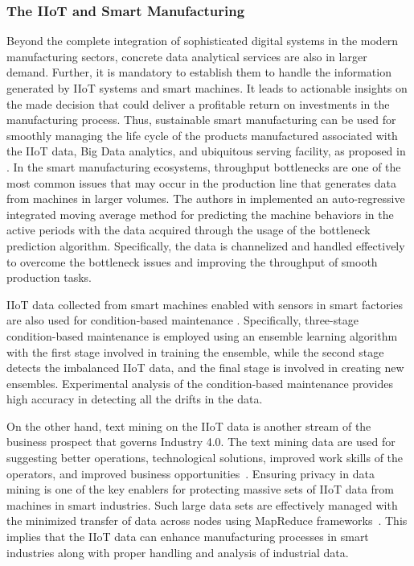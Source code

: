 \documentclass[journal]{IEEEtran}
\begin{document}
\subsubsection{The IIoT and Smart Manufacturing}
Beyond the complete integration of sophisticated digital systems in the modern manufacturing sectors, concrete data analytical services are also in larger demand. Further, it is mandatory to establish them to handle the information generated by IIoT systems and smart machines. It leads to actionable insights on the made decision that could deliver a profitable return on investments in the manufacturing process. Thus, sustainable smart manufacturing can be used for smoothly managing the life cycle of the products manufactured associated with the IIoT data, Big Data analytics, and ubiquitous serving facility, as proposed in \cite{ren_comprehensive_2019}. In the smart manufacturing ecosystems, throughput bottlenecks are one of the most common issues that may occur in the production line that generates data from machines in larger volumes. The authors in \cite{subramaniyan_data-driven_2018} implemented an auto-regressive integrated moving average method for predicting the machine behaviors in the active periods with the data acquired through the usage of the bottleneck prediction algorithm. Specifically, the data is channelized and handled effectively to overcome the bottleneck issues and improving the throughput of smooth production tasks. 

IIoT data collected from smart machines enabled with sensors in smart factories are also used for condition-based maintenance \cite{lin_concept_2019}. Specifically, three-stage condition-based maintenance is employed using an ensemble learning algorithm with the first stage involved in training the ensemble, while the second stage detects the imbalanced IIoT data, and the final stage is involved in creating new ensembles. Experimental analysis of the condition-based maintenance provides high accuracy in detecting all the drifts in the data.  

On the other hand, text mining on the IIoT data is another stream of the business prospect that governs Industry 4.0. The text mining data are used for suggesting better operations, technological solutions, improved work skills of the operators, and improved business opportunities~\cite{galati_industry_2019}. Ensuring privacy in data mining is one of the key enablers for protecting massive sets of IIoT data from machines in smart industries. Such large data sets are effectively managed with the minimized transfer of data across nodes using MapReduce frameworks~\cite{keshk_privacy-preserving_2018}. This implies that the IIoT data can enhance manufacturing processes in smart industries along with proper handling and analysis of industrial data.   
\end{document}
